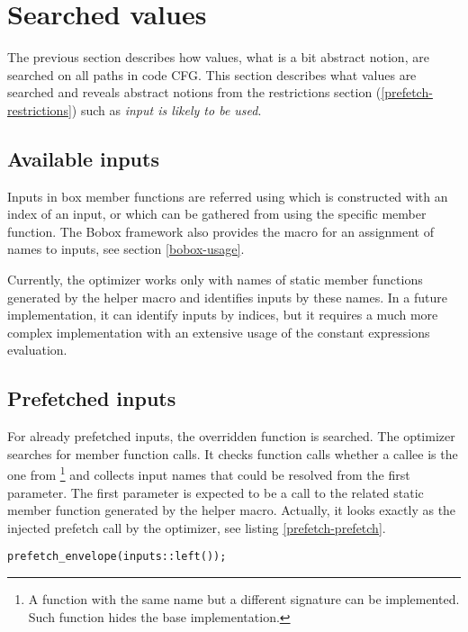 \section{Searched values}
The previous section describes how values, what is a bit abstract notion, are searched on all paths in code CFG. This section describes what values are searched and reveals abstract notions from the restrictions section (\ref{prefetch-restrictions}) such as \textit{input is likely to be used}.

\subsection{Available inputs}
Inputs in box member functions are referred using  which is constructed with an index of an input, or  which can be gathered from  using the specific  member function. The Bobox framework also provides the macro for an assignment of names to inputs, see section \ref{bobox-usage}.

Currently, the optimizer works only with names of static member functions generated by the helper macro and identifies inputs by these names. In a future implementation, it can identify inputs by indices, but it requires a much more complex implementation with an extensive usage of the constant expressions evaluation.

\subsection{Prefetched inputs}
For already prefetched inputs, the overridden  function is searched. The optimizer searches for  member function calls. It checks function calls whether a callee is the one from \footnote{A function with the same name but a different signature can be implemented. Such function hides the base implementation.} and collects input names that could be resolved from the first parameter. The first parameter is expected to be a call to the related static member function generated by the helper macro. Actually, it looks exactly as the injected prefetch call by the optimizer, see listing \ref{prefetch-prefetch}.

\begin{lstlisting}[caption={An injected prefetch call for an input called \emph{left}.},label={prefetch-prefetch}]
prefetch_envelope(inputs::left());
\end{lstlisting}

